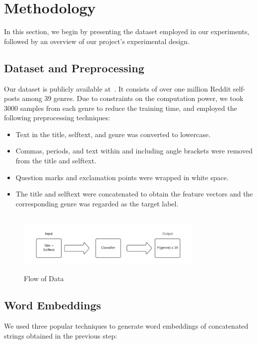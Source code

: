 \documentclass[conference]{IEEEtran}
\begin{document}
\section{Methodology}
In this section, we begin by presenting the dataset employed in our experiments, followed by an overview of our project's experimental design.

\subsection{Dataset and Preprocessing}
Our dataset is publicly available at~\cite{dataset}. It consists of over one million Reddit self-posts among 39 genres. Due to constraints on the computation power, we took 3000 samples from each genre to reduce the training time, and employed the following preprocessing techniques:
\begin{itemize}
    \item Text in the title, selftext, and genre was converted to lowercase.
    \item Commas, periods, and text within and including angle brackets were removed from the title and selftext.
    \item Question marks and exclamation points were wrapped in white space.
    \item The title and selftext were concatenated to obtain the feature vectors and the corresponding genre was regarded as the target label.
\end{itemize}

\begin{figure}[!htb]
\centering
\includegraphics[width=90mm, height = 30mm]{Images/DataPreprocessing.png}
\caption{Flow of Data}\label{fig:dataPreprocessing}
\end{figure}

\subsection{Word Embeddings}
We used three popular techniques to generate word embeddings of concatenated strings obtained in the previous step:
\end{document}
